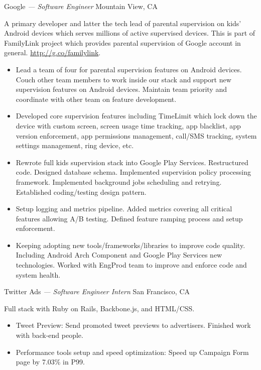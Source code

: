 \documentclass[]{friggeri-cv} %
\begin{document}
\begin{entrylist}
  {Google \emph{--- Software Engineer}}
  {Mountain View, CA}
  {
    A primary developer and latter the tech lead of parental supervision on kids' Android devices which serves millions of active supervised devices.
    This is part of FamilyLink project which provides parental supervision of Google account in general.
    \url{http://g.co/familylink}.
    \begin{itemize}
      \item Lead a team of four for parental supervision features on Android devices.
      Couch other team members to work inside our stack and support new supervision features on Android devices.
      Maintain team priority and coordinate with other team on feature development.
      \item Developed core supervision features including TimeLimit which lock down the device with custom screen, screen usage time tracking, app blacklist, app version enforcement, app permissions management, call/SMS tracking, system settings management, ring device, etc.
      \item Rewrote full kids supervision stack into Google Play Services.
      Restructured code. Designed database schema. Implemented supervision policy processing framework.
      Implemented background jobs scheduling and retrying.
      Established coding/testing design pattern.
      \item Setup logging and metrics pipeline.
      Added metrics covering all critical features allowing A/B testing.
      Defined feature ramping process and setup enforcement.
      \item Keeping adopting new tools/frameworks/libraries to improve code quality.
      Including Android Arch Component and Google Play Services new technologies.
      Worked with EngProd team to improve and enforce code and system health.
    \end{itemize}
  }
  {Twitter Ads \emph{--- Software Engineer Intern}}
  {San Francisco, CA}
  {
    Full stack with Ruby on Rails, Backbone.js, and HTML/CSS.\@
    \begin{itemize}
      \item Tweet Preview: Send promoted tweet previews to advertisers. Finished work with back-end people.
      \item Performance tools setup and speed optimization: Speed up Campaign Form page by 7.03\% in P99.

\end{itemize}}
\end{entrylist}
\end{document}
